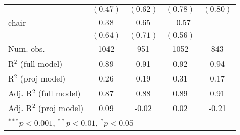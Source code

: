 \documentclass[12pt]{article}
\begin{document}
\begin{table}[H]
\begin{center}
\begin{tabular}{l c c c c }
			& $(0.47)$      & $(0.62)$      & $(0.78)$      & $(0.80)$     \\
			chair                   & $0.38$        & $0.65$        & $-0.57$       &              \\
			& $(0.64)$      & $(0.71)$      & $(0.56)$      &              \\
			\hline
			Num. obs.               & 1042          & 951           & 1052          & 843          \\
			R$^2$ (full model)      & 0.89          & 0.91          & 0.92          & 0.94         \\
			R$^2$ (proj model)      & 0.26          & 0.19          & 0.31          & 0.17         \\
			Adj. R$^2$ (full model) & 0.87          & 0.88          & 0.89          & 0.91         \\
			Adj. R$^2$ (proj model) & 0.09          & -0.02         & 0.02          & -0.21        \\
			\hline
			\multicolumn{5}{l}{\scriptsize{$^{***}p<0.001$, $^{**}p<0.01$, $^*p<0.05$}}
		\end{tabular}
	\end{center}
\end{table}
\end{document}
